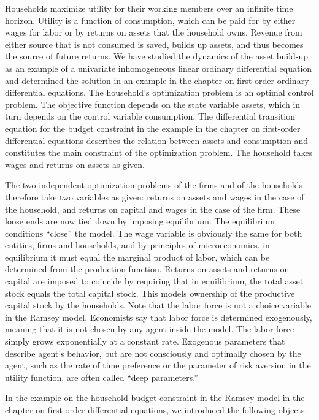 \documentclass[10pt]{article}
\begin{document}
Households maximize utility for their working members over an infinite time horizon. Utility is a function of consumption, which can be paid for by either wages for labor or by returns on assets that the household owns.  Revenue from either source that is not consumed is saved, builds up assets, and thus becomes the source of future returns.  We have studied the dynamics of the asset build-up as an example of a univariate inhomogeneous linear ordinary differential equation and determined the solution in an example in the chapter on first-order ordinary differential equations.  The household's optimization problem is an optimal control problem.  The objective function depends on the state variable assets, which in turn depends on the control variable consumption.  The differential transition equation for the budget constraint in the example in the chapter on first-order differential equations describes the relation between assets and consumption and constitutes the main constraint of the optimization problem.  The household takes wages and returns on assets as given.

\smallskip

The two independent optimization problems of the firms and of the households therefore take two variables as given:  returns on assets and wages in the case of the household, and returns on capital and wages in the case of the firm.  These loose ends are now tied down by imposing equilibrium.  The equilibrium conditions ``close'' the model. The wage variable is obviously the same for both entities, firms and households, and by principles of microeconomics, in equilibrium it must equal the marginal product of labor, which can be determined from the production function.  Returns on assets and returns on capital are imposed to coincide by requiring that in equilibrium, the total asset stock equals the total capital stock. This models ownership of the productive capital stock by the households.  Note that the labor force is not a choice variable in the Ramsey model.  Economists say that labor force is determined exogenously, meaning that it is not chosen by any agent inside the model. The labor force simply grows exponentially at a constant rate.  Exogenous parameters that describe agent's behavior, but are not consciously and optimally chosen by the agent, such as the rate of time preference or the parameter of risk aversion in the utility function, are often called ``deep parameters.''

\smallskip

In the example on the household budget constraint in the Ramsey model in the chapter on first-order differential equations, we introduced the following objects:
\end{document}

